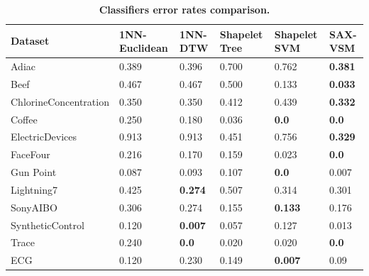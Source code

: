 \documentclass{llncs}
\begin{document}
{\scriptsize
\begin{table}%
\caption{\bf Classifiers error rates comparison.
 \label{tab:perf_table1}}
\centering
\begin{tabularx}{\linewidth}{@{} l *5X @{}}\toprule[1.5pt]
\bf Dataset &\bf 1NN-Euclidean &\bf 1NN-DTW &\bf Shapelet Tree &\bf  Shapelet SVM &\bf 
SAX-VSM\\\midrule
Adiac             & 0.389   & 0.396           & 0.700        & 0.762         & \textbf{0.381}\\
Beef              & 0.467   & 0.467           & 0.500        & 0.133         & \textbf{0.033}\\
ChlorineConcentration  & 0.350 & 0.350        & 0.412        & 0.439         & \textbf{0.332} \\
Coffee            & 0.250   & 0.180           & 0.036     & \textbf{0.0}     & \textbf{0.0} \\
ElectricDevices   & 0.913   & 0.913           & 0.451     & 0.756            & \textbf{0.329} \\
FaceFour          & 0.216   & 0.170           & 0.159     & 0.023            & \textbf{0.0} \\
Gun Point         & 0.087   & 0.093           & 0.107     & \textbf{0.0}     & 0.007 \\
Lightning7        & 0.425   & \textbf{0.274}  & 0.507     & 0.314            & 0.301 \\
SonyAIBO          & 0.306   & 0.274           & 0.155     & \textbf{0.133}   & 0.176 \\
SyntheticControl  & 0.120   & \textbf{0.007}  & 0.057     & 0.127            & 0.013 \\
Trace             & 0.240   & \textbf{0.0}    & 0.020     & 0.020            & \textbf{0.0} \\
ECG               & 0.120   & 0.230           & 0.149     & \textbf{0.007}   & 0.09 \\
\bottomrule[1.25pt]
\end{tabularx}
\end{table}
}
\end{document}
